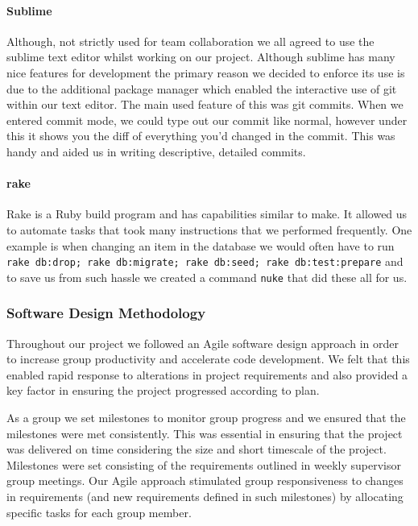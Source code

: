     \paragraph{Sublime\cite{sublime}} Although, not strictly used for team collaboration we all agreed to use the sublime text editor whilst working on our project. Although sublime has many nice features for development the primary reason we decided to enforce its use is due to the additional package manager\cite{sublime_pm} which enabled the interactive use of git within our text editor.
    The main used feature of this was git commits. When we entered commit mode, we could type out our commit like normal, however under this it shows you the diff of everything you'd changed in the commit. This was handy and aided us in writing descriptive, detailed commits.

    \paragraph{rake\cite{rake}} Rake is a Ruby build program and has capabilities similar to make. It allowed us to automate tasks that took many instructions that we performed frequently. One example is when changing an item in the database we would often have to run \verb!rake db:drop; rake db:migrate; rake db:seed; rake db:test:prepare! and to save us from such hassle we created a command \verb!nuke! that did these all for us.

  \subsubsection{Software Design Methodology}
    Throughout our project we followed an Agile software design approach in order to increase group productivity and accelerate code development. We felt that this enabled rapid response to alterations in project requirements and also provided a key factor in ensuring the project progressed according to plan.

    As a group we set milestones to monitor group progress and we ensured that the milestones were met consistently. This was essential in ensuring that the project was delivered on time considering the size and short timescale of the project. Milestones were set consisting of the requirements outlined in weekly supervisor group meetings. Our Agile approach stimulated group responsiveness to changes in requirements (and new requirements defined in such milestones) by allocating specific tasks for each group member. 

